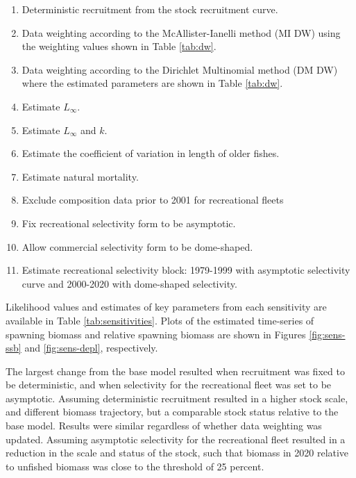 \documentclass[11pt,
  english,
  a4paper,
]{article}
\begin{document}
\begin{enumerate}
   
  \item Deterministic recruitment from the stock recruitment curve. 

  \item Data weighting according to the McAllister-Ianelli method (MI DW) using the weighting values shown in Table \ref{tab:dw}. 
  
  \item Data weighting according to the Dirichlet Multinomial method (DM DW) where the estimated parameters are shown in Table \ref{tab:dw}. 

  \item Estimate $L_{\infty}$.
  
  \item Estimate $L_{\infty}$ and $k$.

  \item Estimate the coefficient of variation in length of older fishes.

  \item Estimate natural mortality.
  
  \item Exclude composition data prior to 2001 for recreational fleets

  \item Fix recreational selectivity form to be asymptotic. 
  
  \item Allow commercial selectivity form to be dome-shaped.

  \item Estimate recreational selectivity block: 1979-1999 with asymptotic selectivity curve and 2000-2020 with dome-shaped selectivity.   
  
\end{enumerate}


Likelihood values and estimates of key parameters from each sensitivity are available in Table \ref{tab:sensitivities}. Plots of the estimated time-series of spawning biomass and relative spawning biomass are shown in Figures \ref{fig:sens-ssb} and \ref{fig:sens-depl}, respectively.

\leavevmode\tagmcend\tagstructend\par


The largest change from the base model resulted when recruitment was fixed to be deterministic, and when selectivity for the recreational fleet was set to be asymptotic. Assuming deterministic recruitment resulted in a higher stock scale, and different biomass trajectory, but a comparable stock status relative to the base model. Results were similar regardless of whether data weighting was updated. Assuming asymptotic selectivity for the recreational fleet resulted in a reduction in the scale and status of the stock, such that biomass in 2020 relative to unfished biomass was close to the threshold of 25 percent.
\end{document}
